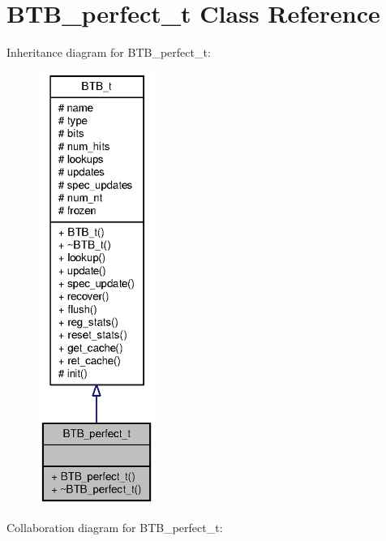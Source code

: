 \section{BTB\_\-perfect\_\-t Class Reference}
\label{classBTB__perfect__t}
Inheritance diagram for BTB\_\-perfect\_\-t:\nopagebreak
\begin{figure}[H]
\begin{center}
\leavevmode
\includegraphics[height=400pt]{classBTB__perfect__t__inherit__graph}
\end{center}
\end{figure}
Collaboration diagram for BTB\_\-perfect\_\-t:\nopagebreak
